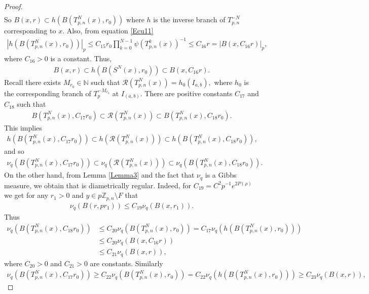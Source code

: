 \documentclass[10pt,a4paper]{amsart}
\newcommand{\Z}{\mathbb{Z}}
\begin{document}
\begin{proof}
\begin{align*}
\end{align*}So $B(x,r)\subset h(B(T^{N}_{p,n}(x),r_{0}))$ where $h$ is the inverse branch of $T^{-N}_{p,n}$ corresponding to $x$. Also, from equation \eqref{Ecu11}
\begin{align*}
    \left|h(B(T^{N}_{p,n}(x),r_{0}))\right|_{p}\leq C_{15}r_{0}\prod^{N-1}_{k=0}\psi(T^{k}_{p,n}(x))^{-1}\leq C_{16}r=|B(x,C_{16}r)|_{p},
\end{align*}where $C_{16}>0$ is a constant. Thus,
\begin{align*}
    B(x,r)\subset h(B(S^{N}(x),r_{0})) \subset B(x,C_{16}r).
\end{align*} Recall there exists $M_{r_{0}}\in \mathbb{N}$ such that $\mathcal{R}(T^{N}_{p,n}(x))=h_{0}(I_{a,b}),$ where $h_{0}$ is the corresponding branch of $T_{p}^{-M_{r_{0}}}$ \textcolor{red}{ } at $I_{(a,b)}$.  There are positive constants $C_{17}$ and $C_{18}$ such that 
\begin{align*}
    B(T^{N}_{p,n}(x),C_{17}r_{0})\subset \mathcal{R}(T^{N}_{p,n}(x))\subset B(T^{N}_{p,n}(x),C_{18}r_{0}).
\end{align*} This implies 
\begin{align*}
    h(B(T^{N}_{p,n}(x),C_{17}r_{0}))\subset h(\mathcal{R}(T^{N}_{p,n}(x)))\subset h(B(T^{N}_{p,n}(x),C_{18}r_{0})), 
\end{align*}and so 
\begin{align}\label{Ecu12}
    \nu_{q}(B(T^{N}_{p,n}(x),C_{17}r_{0}))\subset \nu_{q}(\mathcal{R}(T^{N}_{p,n}(x)))\subset \nu_{q}(B(T^{N}_{p,n}(x),C_{18}r_{0})).
\end{align} On the other hand, from Lemma \ref{Lemma3} and the fact that $\nu_{q}$ is a Gibbs measure, we obtain that is diametrically regular. Indeed, for $C_{19}=C^{2}p^{-1}e^{2P(\rho)}$ we get for any $r_{1}>0$ and $y\in p\Z_{p,n}\setminus F$ that
\begin{align*}
    \nu_{q}(B(r,pr_{1}))\leq C_{19}\nu_{q}(B(x,r_{1})).
\end{align*}Thus
\begin{align*}
    \nu_{q}(B(T^{N}_{p,n}(x),C_{18}r_{0}))&\leq C_{20}\nu_{q}(B(T^{N}_{p,n}(x),r_{0}))=C_{17}\nu_{q}(h(B(T^{N}_{p,n}(x),r_{0})))\\
    & \leq C_{20}\nu_{q}(B(x,C_{16}r))\\
    &\leq C_{21}\nu_{q}(B(x,r)),
\end{align*}where $C_{20}>0$ and $C_{21}>0$ are constants. Similarly
\begin{align*}
    \nu_{q}(B(T^{N}_{p,n}(x),C_{17}r_{0}))\geq C_{22}\nu_{q}(B(T^{N}_{p,n}(x),r_{0}))=C_{22}\nu_{q}(h(B(T^{N}_{p,n}(x),r_{0})))\geq C_{23}\nu_{q}(B(x,r)),

\end{align*}
\end{proof}
\end{document}
